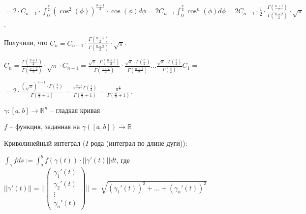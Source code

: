 \begin{example}
\begin{enumerate}
{            $= 2 \cdot C_{n - 1} \cdot \int_{0}^{\frac{\pi}{2}} { \left(\cos^2(\phi)\right)^{\frac{n - 1}{2}} \cdot \cos(\phi) d \phi } = 2 C_{n - 1} \int_{0}^{\frac{\pi}{2}} { \cos^n(\phi) d\phi } = 2 C_{n - 1} \cdot \frac{1}{2} \cdot \frac{\Gamma\left(\frac{n+1}{2}\right)}{\Gamma\left(\frac{n+2}{2}\right)} \cdot \sqrt{\pi}$.

            Получили, что $C_n = C_{n - 1} \cdot \frac{\Gamma\left(\frac{n+1}{2}\right)}{\Gamma\left(\frac{n+2}{2}\right)} \cdot \sqrt{\pi}$.

            $C_n = \frac{\Gamma\left(\frac{n+1}{2}\right)}{\Gamma\left(\frac{n+2}{2}\right)} \cdot \sqrt{\pi} \cdot C_{n - 1} = \frac{\sqrt{\pi} \cdot \Gamma\left(\frac{n+1}{2}\right)}{\Gamma\left(\frac{n+2}{2}\right)} \cdot \frac{\sqrt{\pi} \cdot \Gamma\left(\frac{n}{2}\right)}{\Gamma\left(\frac{n+1}{2}\right)} \dots \frac{\sqrt{\pi} \cdot \Gamma\left(\frac{3}{2}\right)}{\Gamma\left(\frac{4}{2}\right)} C_1 = $

            $= 2 \cdot \frac{(\sqrt{\pi})^{n - 1} \cdot \Gamma\left(\frac{3}{2}\right)}{\Gamma\left(\frac{n}{2} + 1\right)} = \frac{\pi^{\frac{n-1}{2}} \Gamma\left(\frac{1}{2}\right)}{\Gamma\left( \frac{n}{2} + 1 \right)} = \frac{\pi^{\frac{n}{2}}}{\Gamma\left( \frac{n}{2} + 1 \right)}$.
        }
    \end{enumerate}
\end{example}


\begin{definition}
    $\gamma: [a, b] \to \mathbb{R}^n$ -- гладкая кривая

    $f$ -- функция, заданная на $\gamma([a, b]) \to \mathbb{R}$

    Криволинейный интеграл ($I$ рода (интеграл по длине дуги)): 

    $\int_{\gamma}^{}fds := \int_{a}^{b}f(\gamma(t))\cdot ||\gamma'(t)||dt$, где $||\gamma'(t)|| = ||\begin{pmatrix}
        \gamma_1'(t)\\
        \gamma_2'(t)\\
        \vdots\\
        \gamma_n'(t)
    \end{pmatrix}|| = \sqrt[]{(\gamma_1'(t))^2 + \dots + (\gamma_n'(t))^2}$
\end{definition}

